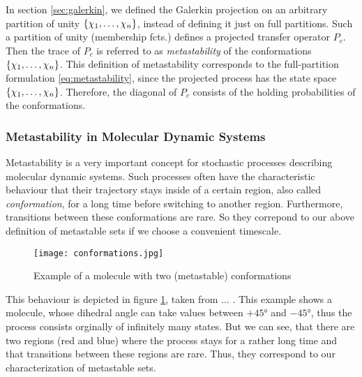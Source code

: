 In section \ref{sec:galerkin}, we defined the Galerkin projection on an arbitrary partition of unity $\{\chi_1,\dots,\chi_n\}$, instead of defining it just on full partitions. Such a partition of unity (membership fcts.) defines a projected transfer operator $P_c$.
Then the trace of $P_c$ is referred to as \textit{metastability} of the conformations $\{\chi_1,\dots,\chi_n\}$.
This definition of metastability corresponds to the full-partition formulation \eqref{eq:metastability}, since the projected process has the state space $\{\chi_1,\dots,\chi_n\}$. Therefore, the diagonal of $P_c$ consists of the holding probabilities of the conformations.

\subsubsection*{Metastability in Molecular Dynamic Systems}

Metastability is a very important concept for stochastic processes describing molecular dynamic systems.
Such processes often have the characteristic behaviour that their trajectory stays inside of a certain
region, also called \textit{conformation},  for a long time before switching to another region. Furthermore, transitions between these conformations are rare. 
So they correpond to our above definition of metastable sets if we choose a convenient timescale.

\begin{figure}[!htb]
	\label{fig:conformations}
	\centering
	\texttt{[image: conformations.jpg]} %
	\caption{Example of a molecule with two (metastable) conformations}
\end{figure}

This behaviour is depicted in figure \ref{fig:conformations}, taken from ... . This example shows a molecule, whose dihedral angle can take values between $+45°$ and $-45°$, thus the process consists orginally of infinitely many states.
But we can see, that there are two regions (red and blue) where the process stays for a rather long time and that transitions between these regions are rare. Thus, they correspond to our characterization of metastable sets.
\\

